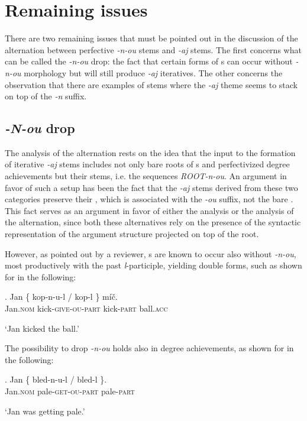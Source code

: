\section{Remaining issues}

There are two remaining issues that must be pointed out in the discussion of the alternation between perfective \textit{-n-ou} stems and  \textit{-aj} stems. The first concerns what can be called the \textit{-n-ou} drop: the fact that certain forms of s can occur without \textit{-n-ou} morphology but will still produce \textit{-aj} iteratives. The other concerns the observation that there are examples of stems where the \textit{-aj} theme seems to stack on top of the \textit{-n} suffix.

\subsection{\textit{-N-ou} drop}

The analysis of the alternation rests on the idea that the input to the formation of iterative 
\textit{-aj} stems includes not only bare roots of s and perfectivized degree achievements but their stems, i.e. the sequences \textit{ROOT-n-ou}. An argument in favor of such a setup has been the fact that the \textit{-aj} stems derived from these two categories preserve their , which is associated with the \textit{-ou} suffix, not the bare . This fact serves as an argument in favor of either the  analysis or the  analysis of the  alternation, since both these alternatives rely on the presence of the syntactic representation of the argument structure projected on top of the root.
\par
However, as pointed out by a reviewer, s are known to occur also without \textit{-n-ou}, most productively with the past \textit{l}-participle, yielding double forms, such as shown for  in the following:

\exg. Jan \{ kop-n-u-l  {/} {kop-l  \}} m\'i\v{c}.\\
Jan.\textsc{nom} {}  kick-\textsc{give-ou-part} {} kick-\textsc{part}  ball.\textsc{acc}\\ 
\strut `Jan kicked the ball.'

The possibility to drop \textit{-n-ou} holds also in  degree achievements, as shown for  in the following:

\exg. Jan \{ bled-n-u-l  {/} {bled-l  \}}.\\
Jan.\textsc{nom} {}  pale-\textsc{get-ou-part} {} pale-\textsc{part}  \\ 
\strut `Jan was getting pale.'

